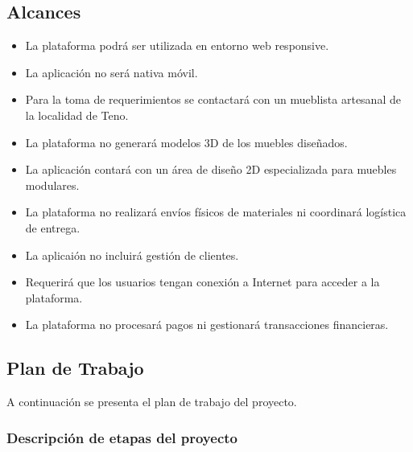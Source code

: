 \documentclass[12pt,oneside]{article}
\begin{document}
\subsection{Alcances}
\begingroup
\small
\begin{itemize}
\item La plataforma podrá ser utilizada en entorno web responsive.

\item La aplicación no será nativa móvil.

\item Para la toma de requerimientos se contactará con un mueblista artesanal de la localidad de Teno.

\item La plataforma no generará modelos 3D de los muebles diseñados.

\item La aplicación contará con un área de diseño 2D especializada para muebles modulares.

\item La plataforma no realizará envíos físicos de materiales ni coordinará logística de entrega.

\item La aplicaión no incluirá gestión de clientes.

\item Requerirá que los usuarios tengan conexión a Internet para acceder a la plataforma.

\item La plataforma no procesará pagos ni gestionará transacciones financieras.

\end{itemize}
\endgroup



\subsection{Plan de Trabajo}
\begingroup
\small
 A continuación se presenta el plan de trabajo del proyecto.
\subsubsection{Descripción de etapas del proyecto}
\end{document}
